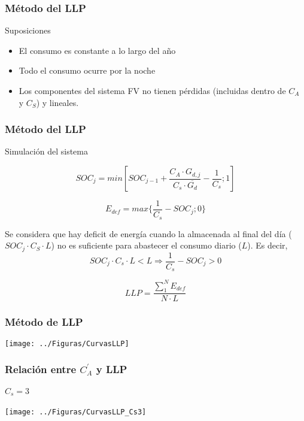 \documentclass[serif, xcolor=dvipsnames]{beamer}
\begin{document}
\begin{frame}
\frametitle{Método del LLP}
\begin{block}
{Suposiciones}
\begin{itemize}
\item El consumo es constante a lo largo del año
\item Todo el consumo ocurre por la noche
\item Los componentes del sistema FV no tienen pérdidas (incluidas dentro
de $C_{A}$ y $C_{S}$) y lineales.
\end{itemize}
\end{block}

\end{frame}

\begin{frame}
\frametitle{Método del LLP}
\begin{block}
{Simulación del sistema}

\[
SOC_{j}=min[SOC_{j-1}+\frac{C_{A}\cdot G_{d,j}}{C_{s}\cdot\overline{G_{d}}}-\frac{1}{C_{s}};1]\]


\[
E_{def}=max\{\frac{1}{C_{s}}-SOC_{j};0\}\]


Se considera que hay deficit de energía cuando la almacenada al final
del día ($SOC_{j}\cdot C_{S}\cdot L$) no es suficiente para abastecer
el consumo diario ($L$). Es decir, \[
SOC_{j}\cdot C_{s}\cdot L<L\Rightarrow\frac{1}{C_{s}}-SOC_{j}>0\]


\[
LLP=\frac{\sum_{1}^{N}E_{def}}{N\cdot L}\]


\end{block}

\end{frame}

\begin{frame}[plain]
\frametitle{Método de LLP}

\begin{center}
\texttt{[image: ../Figuras/CurvasLLP]}
\par\end{center}


\end{frame}

\begin{frame}[plain]
\frametitle{Relación entre $C_{A}^{'}$ y LLP}


\framesubtitle{$C_{s}=3$}

\begin{center}
\texttt{[image: ../Figuras/CurvasLLP\_Cs3]}
\par\end{center}


\end{frame}
\end{document}

